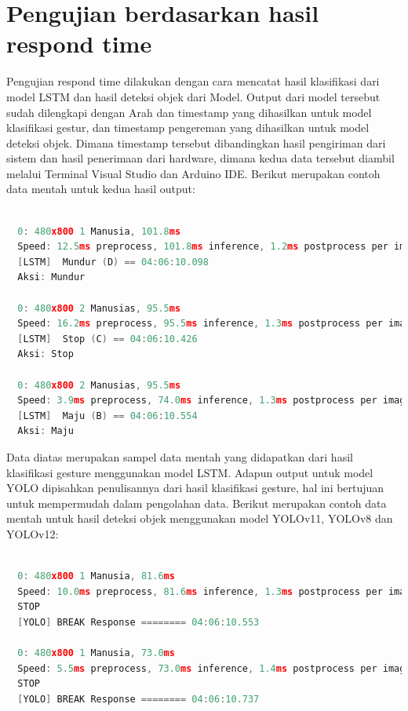 \newpage
\section{Pengujian berdasarkan hasil respond time}
Pengujian respond time dilakukan dengan cara mencatat hasil klasifikasi dari model LSTM dan hasil deteksi objek dari Model. Output dari model tersebut sudah dilengkapi dengan Arah dan timestamp yang dihasilkan untuk model klasifikasi gestur, dan timestamp pengereman yang dihasilkan untuk model deteksi objek. Dimana timestamp tersebut dibandingkan hasil pengiriman dari sistem dan hasil penerimaan dari hardware, dimana kedua data tersebut diambil melalui Terminal Visual Studio dan Arduino IDE. Berikut merupakan contoh data mentah untuk kedua hasil output: 

\begin{lstlisting}[language=c]
  
  0: 480x800 1 Manusia, 101.8ms
  Speed: 12.5ms preprocess, 101.8ms inference, 1.2ms postprocess per image at shape (1, 3, 480, 800)
  [LSTM]  Mundur (D) == 04:06:10.098
  Aksi: Mundur

  0: 480x800 2 Manusias, 95.5ms
  Speed: 16.2ms preprocess, 95.5ms inference, 1.3ms postprocess per image at shape (1, 3, 480, 800)
  [LSTM]  Stop (C) == 04:06:10.426
  Aksi: Stop

  0: 480x800 2 Manusias, 95.5ms
  Speed: 3.9ms preprocess, 74.0ms inference, 1.3ms postprocess per image at shape (1, 3, 480, 800)
  [LSTM]  Maju (B) == 04:06:10.554
  Aksi: Maju

\end{lstlisting}

Data diatas merupakan sampel data mentah yang didapatkan dari hasil klasifikasi gesture menggunakan model LSTM. Adapun output untuk model YOLO dipisahkan penulisannya dari hasil klasifikasi gesture, hal ini bertujuan untuk mempermudah dalam pengolahan data. Berikut merupakan contoh data mentah untuk hasil deteksi objek menggunakan model YOLOv11, YOLOv8 dan YOLOv12:

\begin{lstlisting}[language=c]
  
  0: 480x800 1 Manusia, 81.6ms
  Speed: 10.0ms preprocess, 81.6ms inference, 1.3ms postprocess per image at shape (1, 3, 480, 800)
  STOP
  [YOLO] BREAK Response ======== 04:06:10.553
  
  0: 480x800 1 Manusia, 73.0ms
  Speed: 5.5ms preprocess, 73.0ms inference, 1.4ms postprocess per image at shape (1, 3, 480, 800)
  STOP 
  [YOLO] BREAK Response ======== 04:06:10.737

\end{lstlisting}

